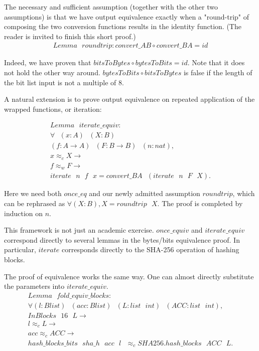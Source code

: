 \documentclass[twocolumn,showpacs,%
  nofootinbib,aps,superscriptaddress,%
  eqsecnum,prd,notitlepage,showkeys,10pt]{revtex4-1}
\newcommand{\eqn}[1] {\begin{gather*}#1\end{gather*}}
\newcommand{\spc} {\textrm{ }}
\newcommand{\s} {\textrm{ }}
\begin{document}
The necessary and sufficient assumption (together with the other two assumptions) is that we have output equivalence exactly when a "round-trip" of composing the two conversion functions results in the identity function. (The reader is invited to finish this short proof.)
\eqn{
Lemma \spc roundtrip : convert\_AB \circ convert\_BA = id }

Indeed, we have proven that $bitsToBytes \circ bytesToBits = id$. Note that it does not hold the other way around. $bytesToBits \circ bitsToBytes$ is false if the length of the bit list input is not a multiple of 8.

A natural extension is to prove output equivalence on repeated application of the wrapped functions, or iteration:


\eqn{
Lemma \spc iterate\_equiv : \\
  \forall  \spc (x : A) \spc (X : B)\\
   (f : A \rightarrow A) \spc (F : B \rightarrow B) \spc (n : nat), \\
    x \approx_c X \rightarrow \\
    f \approx_w F \rightarrow \\
    iterate \spc n \spc f \spc x = convert\_BA \spc (iterate \spc n \spc F \spc X).
}

Here we need both $once\_eq$ and our newly admitted assumption $roundtrip$, which can be rephrased as $\forall (X : B), X = roundtrip \spc X$. The proof is completed by induction on $n$.

This framework is not just an academic exercise. $once\_equiv$ and $iterate\_equiv$ correspond directly to several lemmas in the bytes/bits equivalence proof. In particular, $iterate$ corresponds directly to the SHA-256 operation of hashing blocks. 



The proof of equivalence works the same way. One can almost directly substitute the parameters into $iterate\_equiv$. 
\eqn{
Lemma \s fold\_equiv\_blocks : \\
\forall (l : Blist) \s (acc : Blist) \s (L : list \s int) \s (ACC : list \s int), \\
      InBlocks \s 16 \s L \rightarrow \\
      l \approx_c L \rightarrow \\
      acc \approx_c ACC \rightarrow \\
      hash\_blocks\_bits \s sha\_h \s acc \s l \s \approx_c SHA256.hash\_blocks \s ACC \s L.
}	
\end{document}
